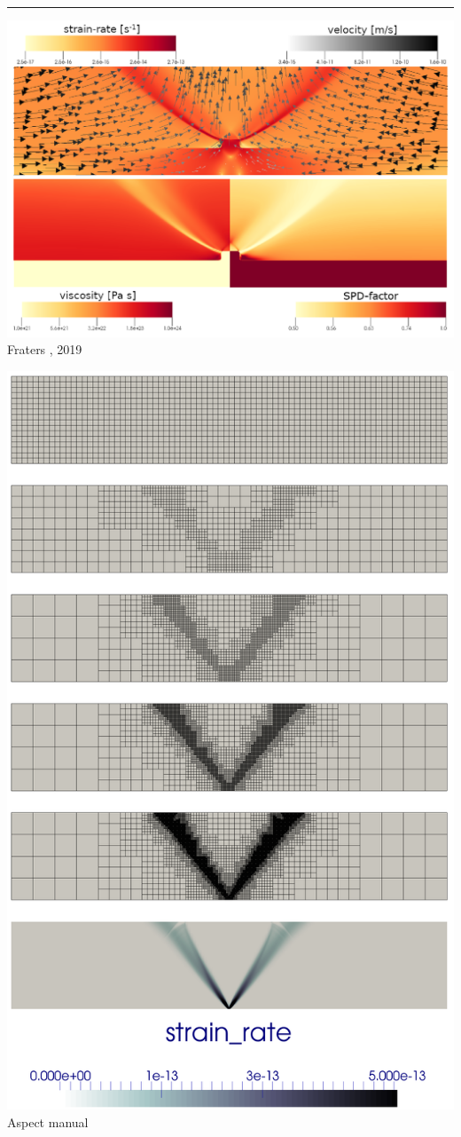 \begin{center}\noindent\rule{12cm}{0.4pt}\end{center}

\begin{center}
\begin{minipage}{0.45\textwidth}
\centering
\includegraphics[height=0.8\textwidth]{images/benchmark_brick/frbt19}\\
{\captionfont Fraters \etal, 2019 \cite{frbt19}}
\end{minipage}\hfill
\begin{minipage}{0.45\textwidth}
\centering
\includegraphics[height=0.8\textwidth]{images/benchmark_brick/aspectmanual}\\
{\captionfont Aspect manual \cite{aspectmanual}}
\end{minipage}
\end{center}


